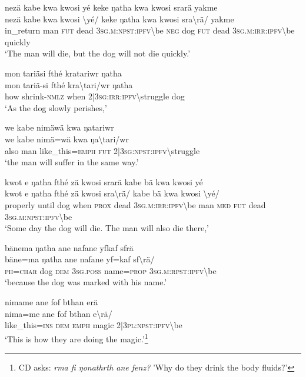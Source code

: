 \ea\label{ex:a4372}
nezä kabe kwa kwosi yé keke ŋatha kwa kwosi srarä yakme\\
\gll nezä	kabe	kwa	kwosi	{\textbackslash}yé/	keke	ŋatha	kwa	kwosi	sra{\textbackslash}rä/	yakme\\
     in\_return	man	\textsc{fut}	dead	3\textsc{sg}.\textsc{m}:\textsc{npst}:\textsc{ipfv}{\textbackslash}be	\textsc{neg}	dog	\textsc{fut}	dead	3\textsc{sg}.\textsc{m}:\textsc{irr}:\textsc{ipfv}{\textbackslash}be	quickly\\
\glt `The man will die, but the dog will not die quickly.'
\z

\ea\label{ex:a4373}
mon tariäsi fthé kratariwr ŋatha\\
\gll mon	tariä-si	fthé	kra{\textbackslash}tari/wr	ŋatha\\
     how	shrink-\textsc{nmlz}	when	2|3\textsc{sg}:\textsc{irr}:\textsc{ipfv}{\textbackslash}struggle	dog\\
\glt `As the dog slowly perishes,'
\z

\ea\label{ex:a4374}
we kabe nimäwä kwa ŋatariwr\\
\gll we	kabe	nimä=wä	kwa	ŋa{\textbackslash}tari/wr\\
     also	man	like\_this=\textsc{emph}	\textsc{fut}	2|3\textsc{sg}:\textsc{npst}:\textsc{ipfv}{\textbackslash}struggle\\
\glt `the man will suffer in the same way.'
\z

\ea\label{ex:a4375}
kwot e ŋatha fthé zä kwosi srarä kabe bä kwa kwosi yé\\
\gll kwot	e	ŋatha	fthé	zä	kwosi	sra{\textbackslash}rä/	kabe	bä	kwa	kwosi	{\textbackslash}yé/\\
     properly	until	dog	when	\textsc{prox}	dead	3\textsc{sg}.\textsc{m}:\textsc{irr}:\textsc{ipfv}{\textbackslash}be	man	\textsc{med}	\textsc{fut}	dead	3\textsc{sg}.\textsc{m}:\textsc{npst}:\textsc{ipfv}{\textbackslash}be\\
\glt `Some day the dog will die. The man will also die there,'
\z

\ea\label{ex:a4376}
bänema ŋatha ane nafane yfkaf sfrä\\
\gll bäne=ma	ŋatha	ane	nafane	yf=kaf	sf{\textbackslash}rä/\\
     \textsc{ph}=\textsc{char}	dog	\textsc{dem}	3\textsc{sg}.\textsc{poss}	name=\textsc{prop}	3\textsc{sg}.\textsc{m}:\textsc{rpst}:\textsc{ipfv}{\textbackslash}be\\
\glt `because the dog was marked with his name.'
\z

\ea\label{ex:a4377}
nimame ane fof bthan erä\\
\gll nima=me	ane	fof	bthan	e{\textbackslash}rä/\\
     like\_this=\textsc{ins}	\textsc{dem}	\textsc{emph}	magic	2|3\textsc{pl}:\textsc{npst}:\textsc{ipfv}{\textbackslash}be\\
\glt `This is how they are doing the magic.'\footnote{CD asks: \textit{rma fi ŋonathrth ane fenz?} 'Why do they drink the body fluids?'}
\z

